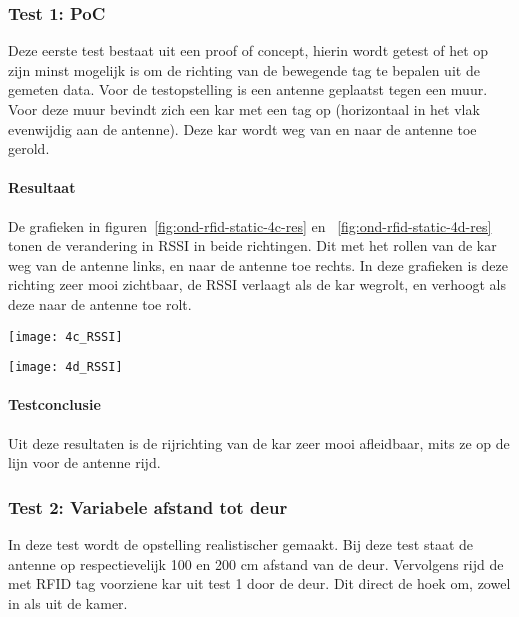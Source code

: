 \subsubsection{Test 1: PoC}
\label{sec:ond-rfid-3-1}
Deze eerste test bestaat uit een proof of concept, hierin wordt getest of het op zijn minst mogelijk is om de richting van de bewegende tag te bepalen uit de gemeten data. 
Voor de testopstelling is een antenne geplaatst tegen een muur. Voor deze muur bevindt zich een kar met een tag op (horizontaal in het vlak evenwijdig aan de antenne). Deze kar wordt weg van en naar de antenne toe gerold.

\paragraph{Resultaat}
De grafieken in figuren~\ref{fig:ond-rfid-static-4c-res} en ~\ref{fig:ond-rfid-static-4d-res}  tonen de verandering in RSSI in beide richtingen. Dit met het rollen van de kar weg van de antenne links, en naar de antenne toe rechts. In deze grafieken is deze richting zeer mooi zichtbaar, de RSSI verlaagt als de kar wegrolt, en verhoogt als deze naar de antenne toe rolt.

\begin{minipage}{0.42\textwidth}
	\texttt{[image: 4c\_RSSI]}
	\label{fig:ond-rfid-static-4c-res}
\end{minipage}
\hfill
\begin{minipage}{0.42\textwidth}
	\texttt{[image: 4d\_RSSI]}
	\label{fig:ond-rfid-static-4d-res}
\end{minipage}

\paragraph{Testconclusie}
Uit deze resultaten is de rijrichting van de kar zeer mooi afleidbaar, mits ze op de lijn voor de antenne rijd.

\subsubsection{Test 2: Variabele afstand tot deur}
\label{sec:ond-rfid-3-2}
In deze test wordt de opstelling realistischer gemaakt. Bij deze test staat de antenne op respectievelijk 100 en 200 cm afstand van de deur. Vervolgens rijd de met RFID tag voorziene kar uit test 1 door de deur. Dit direct de hoek om, zowel in als uit de kamer.

